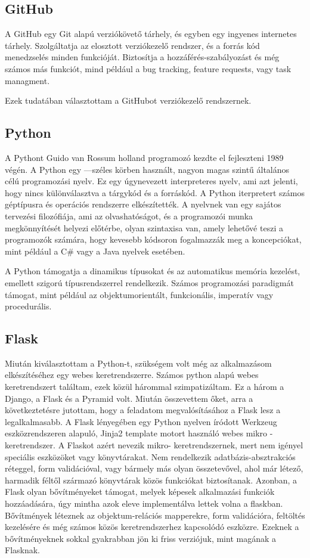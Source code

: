\subsection{GitHub}

A GitHub egy Git alapú verziókövető tárhely, és egyben egy ingyenes internetes tárhely. Szolgáltatja az elosztott verziókezelő rendszer, és a forrás kód menedzselés minden funkcióját. Biztosítja a hozzáférés-szabályozást és még számos más funkciót, mind például a bug tracking, feature requests, vagy task managment.

Ezek tudatában választottam a GitHubot verziókezelő rendszernek.

\subsection{Python}

A Pythont Guido van Rossum holland programozó kezdte el fejleszteni 1989 végén. A Python egy ––széles körben használt, nagyon magas szintű általános célú programozási nyelv. Ez egy úgynevezett interpreteres nyelv, ami azt jelenti, hogy nincs különválasztva a tárgykód és a forráskód. A Python iterpretert számos géptípusra és operációs rendszerre elkészítették. A nyelvnek van egy sajátos tervezési filozófiája, ami az olvashatóságot, és a programozói munka megkönnyítését helyezi előtérbe, olyan szintaxisa van, amely lehetővé teszi a programozók számára, hogy kevesebb kódsoron fogalmazzák meg a koncepciókat, mint például a C\# vagy a Java nyelvek esetében.

A Python támogatja a dinamikus típusokat és az automatikus memória kezelést, emellett szigorú típusrendszerrel rendelkezik. Számos programozási paradigmát támogat, mint például az objektumorientált, funkcionális, imperatív vagy procedurális.

\subsection{Flask}

Miután kiválasztottam a Python-t, szükségem volt még az alkalmazásom elkészítéséhez egy webes keretrendszerre. Számos python alapú webes keretrendszert találtam, ezek közül hárommal szimpatizáltam. Ez a három a Django, a Flask és a Pyramid volt. Miután összevettem őket, arra a következtetésre jutottam, hogy a feladatom megvalósításához a Flask lesz a legalkalmasabb.
A Flask lényegében egy Python nyelven íródott Werkzeug eszközrendszeren alapuló, Jinja2 template motort használó webes mikro - keretrendszer. A Flaskot azért nevezik mikro- keretrendszernek, mert nem igényel speciális eszközöket vagy könyvtárakat. Nem rendelkezik adatbázis-absztrakciós réteggel, form validációval, vagy bármely más olyan összetevővel, ahol már létező, harmadik féltől származó könyvtárak közös funkciókat biztosítanak. Azonban, a Flask olyan bővítményeket támogat, melyek képesek alkalmazási funkciók hozzáadására, úgy mintha azok eleve implementálva lettek volna a flaskban. Bővítmények léteznek az objektum-relációs mapperekre, form validációra, feltöltés kezelésére és még számos közös keretrendszerhez kapcsolódó eszközre. Ezeknek a bővítményeknek sokkal gyakrabban jön ki friss verziójuk, mint magának a Flasknak.

